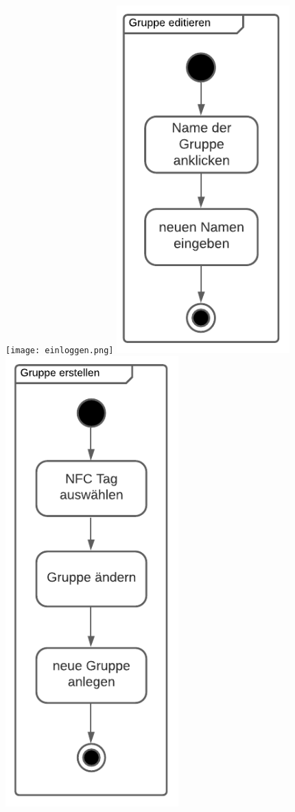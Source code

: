 \documentclass[10pt, a4paper]{article}
\begin{document}
  \texttt{[image: einloggen.png]}
  \newpage
  \includegraphics[width=0.5\textwidth]{gruppe editieren.png}
  \includegraphics[width=0.5\textwidth]{gruppe erstellen.png}
\end{document}
